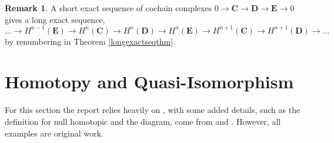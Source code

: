 \documentclass[11.5pt, twoside, a4paper, titlepage]{report}
\theoremstyle{definition}
\newtheorem{rem}[mydef]{Remark}
\theoremstyle{plain}
\begin{document}
\begin{rem} \label{longexactseqcochainrem}
A short exact sequence of cochain complexes $0\xrightarrow{}\mathbf{C}\xrightarrow{}\mathbf{D} \xrightarrow{} \mathbf{E}\xrightarrow{}0$ gives a long exact sequence,
\begin{equation*}
\dots \xrightarrow{} H^{n-1}(\mathbf{E})\xrightarrow{}H^n(\mathbf{C})\xrightarrow{}H^n(\mathbf{D})\xrightarrow{}H^n(\mathbf{E})\xrightarrow{} H^{n+1}(\mathbf{C})\xrightarrow{} H^{n+1}(\mathbf{D})\xrightarrow{} \dots
\end{equation*}
by renumbering in Theorem \ref{longexactseqthm}.
\end{rem}


\section{Homotopy and Quasi-Isomorphism}

For this section the report relies heavily on \cite{CB1}, with some added details, such as the definition for null homotopic and the diagram, come from \cite{Weibel} and \cite{Rotman}. However, all examples are original work.
\end{document}
